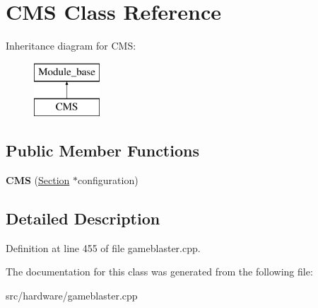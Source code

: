\hypertarget{classCMS}{\section{C\-M\-S Class Reference}
\label{classCMS}
}
Inheritance diagram for C\-M\-S\-:\begin{figure}[H]
\begin{center}
\leavevmode
\includegraphics[height=2.000000cm]{classCMS}
\end{center}
\end{figure}
\subsection*{Public Member Functions}
\begin{DoxyCompactItemize}
\item 
\hypertarget{classCMS_afc0f43ea744137735477433ee764c729}{{\bfseries C\-M\-S} (\hyperlink{classSection}{Section} $\ast$configuration)}\label{classCMS_afc0f43ea744137735477433ee764c729}

\end{DoxyCompactItemize}


\subsection{Detailed Description}


Definition at line 455 of file gameblaster.\-cpp.



The documentation for this class was generated from the following file\-:\begin{DoxyCompactItemize}
\item 
src/hardware/gameblaster.\-cpp\end{DoxyCompactItemize}
